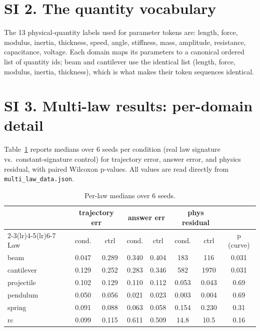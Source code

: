 \documentclass[11pt,a4paper]{article}
\begin{document}
\section*{SI 2. The quantity vocabulary}
\label{si:quantities}

The 13 physical-quantity labels used for parameter tokens are: length,
force, modulus, inertia, thickness, speed, angle, stiffness, mass,
amplitude, resistance, capacitance, voltage. Each domain maps its parameters
to a canonical ordered list of quantity ids; beam and cantilever use the
identical list (length, force, modulus, inertia, thickness), which is what
makes their token sequences identical.

\section*{SI 3. Multi-law results: per-domain detail}
\label{si:multilaw}

Table~\ref{tab:si3} reports medians over 6 seeds per condition (real law
signature vs.\ constant-signature control) for trajectory error, answer
error, and physics residual, with paired Wilcoxon p-values. All values are
read directly from \texttt{multi\_law\_data.json}.

\begin{table}[h]
\centering
\caption{Per-law medians over 6 seeds.}
\label{tab:si3}
\small
\begin{tabular}{@{}lccccccc@{}}
\toprule
 & \multicolumn{2}{c}{trajectory err} & \multicolumn{2}{c}{answer err} & \multicolumn{2}{c}{phys residual} & \\
\cmidrule(lr){2-3}\cmidrule(lr){4-5}\cmidrule(lr){6-7}
Law & cond. & ctrl & cond. & ctrl & cond. & ctrl & p (curve) \\
\midrule
beam & 0.047 & 0.289 & 0.340 & 0.404 & 183 & 116 & 0.031 \\
cantilever & 0.129 & 0.252 & 0.283 & 0.346 & 582 & 1970 & 0.031 \\
projectile & 0.102 & 0.129 & 0.110 & 0.112 & 0.053 & 0.043 & 0.69 \\
pendulum & 0.050 & 0.056 & 0.021 & 0.023 & 0.003 & 0.004 & 0.69 \\
spring & 0.091 & 0.088 & 0.063 & 0.058 & 0.154 & 0.230 & 0.31 \\
rc & 0.099 & 0.115 & 0.611 & 0.509 & 14.8 & 10.5 & 0.16 \\
\bottomrule
\end{tabular}
\end{table}
\end{document}
